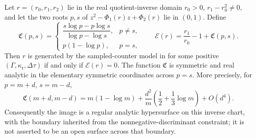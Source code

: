 \begin{theorem}
\label{thm:exact-sampled-counter-image-main}
Let \(r=(r_0,r_1,r_2)\) lie in the real quotient-inverse domain
\(r_0>0\), \(r_1-r_0^2\ne0\), and let the two roots \(p,s\) of
\(z^2-\Phi_1(r)z+\Phi_2(r)\) lie in \((0,1)\).  Define
\[
\mathfrak C(p,s)=
\begin{cases}
\dfrac{s\log p-p\log s}{\log p-\log s},&p\ne s,\\[6pt]
p(1-\log p),&p=s,
\end{cases}
\qquad
\mathcal E(r)=\frac{r_1}{r_0}-1+\mathfrak C(p,s).
\]
Then \(r\) is generated by the sampled-counter model in
 for some positive
\((\Gamma,\kappa_{\mathrm r},\Delta\tau)\) if and only if
\(\mathcal E(r)=0\).  The function \(\mathfrak C\) is symmetric and real
analytic in the elementary symmetric coordinates across \(p=s\).  More
precisely, for \(p=m+d\), \(s=m-d\),
\begin{equation}\label{eq:log-divided-difference-diagonal-main}
\mathfrak C(m+d,m-d)
=m(1-\log m)+\frac{d^2}{m}
 \left(\frac12+\frac13\log m\right)+O(d^4).
\end{equation}
Consequently the image is a regular analytic hypersurface on this inverse
chart, with the boundary inherited from the nonnegative-discriminant
constraint; it is not asserted to be an open surface across that boundary.
\end{theorem}

